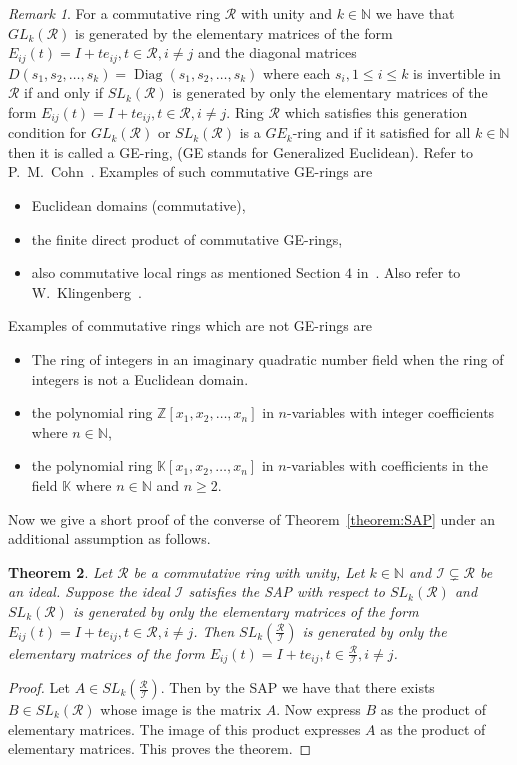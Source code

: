 \documentclass[12pt]{amsart}
\newcommand{\sbnq}{\subsetneq}
\newcommand{\mbb}{\mathbb}
\newcommand{\mcl}{\mathcal}
\newcommand{\I}{\mcl I}
\newcommand{\N}{\mbb N}
\newcommand{\Z}{\mbb Z}
\newcommand{\R}{\mcl R}
\DeclareMathOperator{\Diag}{Diag}
\theoremstyle{plain}
\newtheorem{theorem}{Theorem}[section]
\theoremstyle{definition}
\theoremstyle{remark}
\newtheorem{remark}[theorem]{Remark}
\numberwithin{equation}{section}
\begin{document}
\begin{remark}
	\label{remark:GE}
	For a commutative ring $\R$ with unity and $k\in \N$ we have that $GL_k(\R)$ is generated by the elementary matrices of the form $E_{ij}(t)=I+te_{ij},t\in \R,i\neq j$ and the diagonal matrices $D(s_1,s_2,\ldots,s_k)=\Diag(s_1,s_2,\ldots,s_k)$ where each $s_i,1\leq i\leq k$ is invertible in $\R$ if and only if $SL_k(\R)$ is generated by only the elementary matrices of the form $E_{ij}(t)=I+te_{ij},t\in \R,i\neq j$. Ring $\R$ which satisfies this generation condition for $GL_k(\R)$ or $SL_k(\R)$ is a $GE_k$-ring and if it satisfied for all $k\in \N$ then it is called a GE-ring, (GE stands for Generalized Euclidean). Refer to P.~M.~Cohn~\cite{MR0207856}. Examples of such commutative GE-rings are
	\begin{itemize}
		\item Euclidean domains (commutative), 
		\item the finite direct product of commutative GE-rings, 
		\item also commutative local rings as mentioned Section $4$ in~\cite{MR0207856}. Also refer to W.~Klingenberg~\cite{MR0143817}.
	\end{itemize}
	Examples of commutative rings which are not GE-rings are
	\begin{itemize}
		\item The ring of integers in an imaginary quadratic number field when the ring of integers is not a Euclidean domain.
		\item the polynomial ring $\Z[x_1,x_2,\ldots,x_n]$ in $n$-variables with integer coefficients where $n\in \N$,
		\item the polynomial ring $\mbb{K}[x_1,x_2,\ldots,x_n]$ in $n$-variables with coefficients in the field $\mbb{K}$ where $n\in \N$ and $n\geq 2$.   
	\end{itemize} 	
\end{remark}
Now we give a short proof of the converse of Theorem~\ref{theorem:SAP} under an additional assumption as follows.
\begin{theorem}
	\label{theorem:SAPConverse}
Let $\R$ be a commutative ring with unity, Let $k\in \N$ and $\I\sbnq \R$ be an ideal. Suppose the ideal $\I$ satisfies the SAP with respect to $SL_k(\R)$ and $SL_k(\R)$ is generated by only the elementary matrices of the form $E_{ij}(t)=I+te_{ij},t\in \R,i\neq j$. Then $SL_k(\frac{\R}{\I})$ is generated by only the elementary matrices of the form $E_{ij}(t)=I+te_{ij},t\in \frac{\R}{\I},i\neq j$.
\end{theorem} 
\begin{proof}
Let $A\in SL_k(\frac{\R}{\I})$. Then by the SAP we have that there exists $B\in SL_k(\R)$ whose image is the matrix $A$. Now express $B$ as the product of elementary matrices. The image of this product expresses $A$ as the product of elementary matrices. This proves the theorem.
\end{proof}
\end{document}
